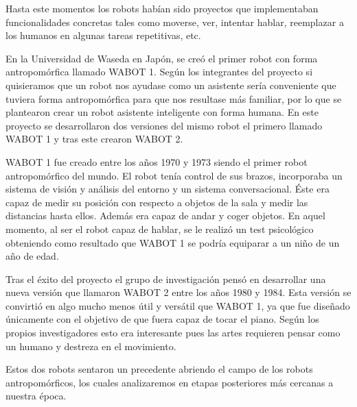Hasta este momentos los robots habían sido proyectos que implementaban funcionalidades concretas tales como moverse, ver, intentar hablar, reemplazar a los humanos en algunas tareas repetitivas, etc.

\vspace{10px}

En la Universidad de Waseda en Japón, se creó el primer robot con forma antropomórfica llamado WABOT 1. Según los integrantes del proyecto si quisieramos que un robot nos ayudase como un asistente sería conveniente que tuviera forma antropomórfica para que nos resultase más familiar, por lo que se plantearon crear un robot asistente inteligente con forma humana. En este proyecto se desarrollaron dos versiones del mismo robot el primero llamado WABOT 1 y tras este crearon WABOT 2.

\vspace{10px}

WABOT 1 fue creado entre los años 1970 y 1973 siendo el primer robot antropomórfico del mundo. El robot tenía control de sus brazos, incorporaba un sistema de visión y análisis del entorno y un sistema conversacional. Éste era capaz de medir su posición con respecto a objetos de la sala y medir las distancias hasta ellos. Además era capaz de andar y coger objetos. En aquel momento, al ser el robot capaz de hablar, se le realizó un test psicológico obteniendo como resultado que WABOT 1 se podría equiparar a un niño de un año de edad.

\vspace{10px}

Tras el éxito del proyecto el grupo de investigación pensó en desarrollar una nueva versión que llamaron WABOT 2 entre los años 1980 y 1984. Esta versión se convirtió en algo mucho menos útil y versátil que WABOT 1, ya que fue diseñado únicamente con el objetivo de que fuera capaz de tocar el piano. Según los propios investigadores esto era interesante pues las artes requieren pensar como un humano y destreza en el movimiento.

\vspace{10px}

Estos dos robots sentaron un precedente abriendo el campo de los robots antropomórficos, los cuales analizaremos en etapas posteriores más cercanas a nuestra época.
